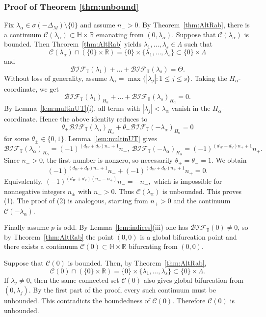 \documentclass[reqno,twoside,12pt]{amsart}
\newcommand{\bH}{\mathbb{H}}
\newcommand{\bR}{\mathbb{R}}
\newcommand{\bT}{\mathbb{T}}
\newcommand{\cC}{\mathcal{C}}
\numberwithin{equation}{section} \errorcontextlines=0
\newcommand{\BIF}{\mathcal{BIF}}
\begin{document}
\subsubsection*{Proof of Theorem \ref{thm:unbound}}\label{subsec:proof}
Fix $\lambda_\alpha\in\sigma(-\Delta_M)\setminus\{0\}$ and assume $n_->0$. By Theorem~\ref{thm:AltRab}, there is a continuum $\cC(\lambda_\alpha)\subset\bH\times\bR$ emanating from $(0,\lambda_\alpha)$. Suppose that $\cC(\lambda_\alpha)$ is bounded. Then Theorem~\ref{thm:AltRab} yields $\lambda_1,\dots,\lambda_s\in\Lambda$ such that
\[
\cC(\lambda_\alpha)\cap(\{0\}\times\bR)=\{0\}\times\{\lambda_1,\dots,\lambda_s\}\subset\{0\}\times\Lambda\]
and
\[\BIF_\bT(\lambda_1)+\dots+\BIF_\bT(\lambda_s)=\Theta.
\]
Without loss of generality, assume $\lambda_\alpha=\max\{|\lambda_j|:1\le j\le s\}$. Taking the $H_\alpha$-coordinate, we get
\[
\BIF_\bT(\lambda_1)_{H_\alpha}+\dots+\BIF_\bT(\lambda_s)_{H_\alpha}=0.
\]
By Lemma~\ref{lem:multinUT}(i), all terms with $|\lambda_j|<\lambda_\alpha$ vanish in the $H_\alpha$-coordinate. Hence the above identity reduces to
\[
\theta_+\BIF_\bT(\lambda_\alpha)_{H_\alpha}+\theta_-\BIF_\bT(-\lambda_\alpha)_{H_\alpha}=0
\]
for some $\theta_\pm\in\{0,1\}$.
Lemma~\ref{lem:multinUT} gives
\[
\BIF_\bT(\lambda_\alpha)_{H_\alpha}=(-1)^{(d_W+d_V)n_-+1}n_-,\
\BIF_\bT(-\lambda_\alpha)_{H_\alpha}=(-1)^{(d_W+d_V)n_++1}n_+.
\]
Since $n_->0$, the first number is nonzero, so necessarily $\theta_+=\theta_-=1$. We obtain
\[
(-1)^{(d_W+d_V)n_-+1}n_-+(-1)^{(d_W+d_V)n_++1}n_+=0.
\]
Equivalently,
$
(-1)^{(d_W+d_V)(n_--n_+)}n_-=-n_+,
$
which is impossible for nonnegative integers $n_\pm$ with $n_->0$. Thus $\cC(\lambda_\alpha)$ is unbounded. This proves (1). The proof of (2) is analogous, starting from $n_+>0$ and the continuum $\cC(-\lambda_\alpha)$.


Finally assume $p$ is odd. By Lemma~\ref{lem:indices}(iii) one has $\BIF_{\bT}(0)\neq 0$, so by Theorem~\ref{thm:AltRab} the point $(0,0)$ is a global bifurcation point and there exists a continuum $\cC(0)\subset\bH\times\bR$ bifurcating from $(0,0)$.

Suppose that $\cC(0)$ is bounded. Then, by Theorem~\ref{thm:AltRab},
\[
\cC(0)\cap(\{0\}\times\bR)=\{0\}\times\{\lambda_1,\dots,\lambda_s\}\subset\{0\}\times\Lambda.
\]
If $\lambda_j\neq 0$, then the same connected set $\cC(0)$ also gives global bifurcation from $(0,\lambda_j)$. By the first part of the proof, every such continuum must be unbounded. This contradicts the boundedness of $\cC(0)$. Therefore $\cC(0)$ is unbounded.
\end{document}
